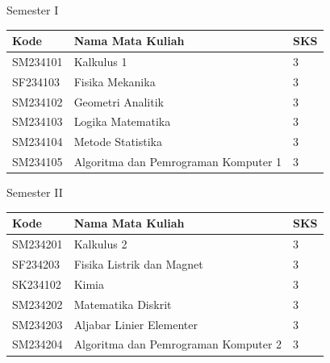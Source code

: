 \documentclass[aspectratio=169]{beamer} %
\begin{document}

\begin{frame}{Semester I}

\begin{table}
	\renewcommand{\arraystretch}{1.3}
	\setlength{\tabcolsep}{10pt}
	\begin{tabular}{l l l}
		\toprule
		\textbf{Kode} & \textbf{Nama Mata Kuliah} & \textbf{SKS} \\
		\midrule
		SM234101 & Kalkulus 1 & 3 \\
		SF234103 & Fisika Mekanika & 3 \\
		SM234102 & Geometri Analitik & 3 \\
		SM234103 & Logika Matematika & 3 \\
		SM234104 & Metode Statistika & 3 \\
		SM234105 & Algoritma dan Pemrograman Komputer 1 & 3 \\
		\bottomrule
	\end{tabular}
\end{table}

\end{frame}


\begin{frame}{Semester II}

\begin{table}
	\renewcommand{\arraystretch}{1.3}
	\setlength{\tabcolsep}{10pt}
	\begin{tabular}{l l l}
		\toprule
		\textbf{Kode} & \textbf{Nama Mata Kuliah} & \textbf{SKS} \\
		\midrule
		SM234201 & Kalkulus 2 & 3 \\
		SF234203 & Fisika Listrik dan Magnet & 3 \\
		SK234102 & Kimia & 3 \\
		SM234202 & Matematika Diskrit & 3 \\
		SM234203 & Aljabar Linier Elementer & 3 \\
		SM234204 & Algoritma dan Pemrograman Komputer 2 & 3 \\
		\bottomrule
	\end{tabular}
\end{table}

\end{frame}
\end{document}
